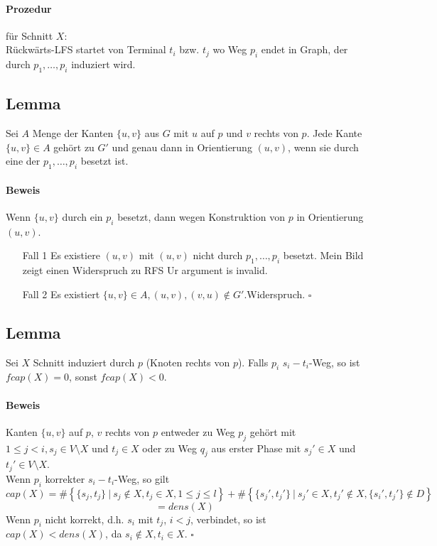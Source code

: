 \documentclass{article}
\newcommand{\set}[2]{\left\lbrace #1~|~#2 \right\rbrace}
\newcommand{\qed}{$\square$}
\begin{document}
\paragraph{Prozedur} für Schnitt $X$:\\
Rückwärts-\textsc{LFS} startet von Terminal $t_i$ bzw. $t_j$ wo Weg $p_i$ endet in Graph, der durch $p_1,\ldots, p_i$ induziert wird.

\subsection{Lemma}
Sei $A$ Menge der Kanten $\{u,v\}$ aus $G$ mit $u$ auf $p$ und $v$ rechts von $p$. Jede Kante $\{u,v\} \in A$ gehört zu $G'$ und genau dann in Orientierung $(u,v)$, wenn sie durch eine der $p_1, \ldots, p_i$ besetzt ist.

\paragraph{Beweis}
Wenn $\{u,v\}$ durch ein $p_i$ besetzt, dann wegen Konstruktion von $p$ in Orientierung $(u,v)$.
\begin{enumerate}
	\item[Fall 1] Es existiere $(u,v)$ mit $(u,v)$ nicht durch $p_1, \ldots, p_i$ besetzt. Mein Bild zeigt einen Widerspruch zu RFS Ur argument is invalid.
	\item[Fall 2] Es existiert $\{u,v\} \in A, (u,v), (v,u) \notin G'$.Widerspruch.
	\qed
\end{enumerate}

\subsection{Lemma}
Sei $X$ Schnitt induziert durch $p$ (Knoten rechts von $p$). Falls $p_i$ $s_i-t_i$-Weg, so ist $fcap(X) = 0$, sonst $fcap(X) < 0$.
\paragraph{Beweis}
Kanten $\{u,v\}$ auf $p$, $v$ rechts von $p$ entweder zu Weg $p_j$ gehört mit $1 \leq j < i, s_j \in V\setminus X$ und $t_j\in X$ oder zu Weg $q_j$ aus erster Phase mit $s_j'\in X$ und $t_j' \in V\setminus X$.\\
Wenn $p_i$ korrekter $s_i-t_i$-Weg, so gilt
\[cap(X) = \# \set{\{s_j, t_j\}}{s_j \notin X, t_j \in X, 1 \leq j \leq l}
+\# \set{\{s_j', t_j'\}}{s_j' \in X, t_j' \notin X, \{s_i', t_j'\} \notin D } \]
\[ = dens(X)\]
Wenn $p_i$ nicht korrekt, d.h. $s_i$ mit $t_j$, $i< j$, verbindet, so ist $cap(X) < dens(X)$, da $s_i \notin X, t_i \in X$.
\qed
\end{document}

